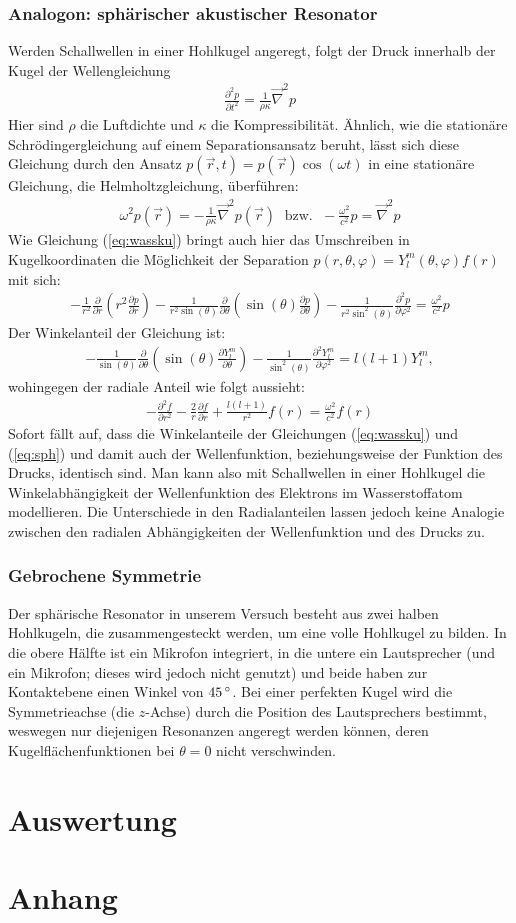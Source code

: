 \documentclass[numbers=noenddot,12pt,a4paper]{scrartcl}
\newcommand{\degree}{^\circ}
\newcommand{\partiell}[2]{\frac{\partial #1}{\partial #2}}
\newcommand{\partiellz}[2]{\frac{\partial^2 #1}{\partial #2^2}}
\begin{document}
\subsubsection{Analogon: sphärischer akustischer Resonator}
Werden Schallwellen in einer Hohlkugel angeregt, folgt der Druck innerhalb der Kugel der Wellengleichung
\begin{align}
\partiellz{p}{t}=\frac{1}{\rho\kappa}\vec{\nabla}^2p
\end{align}
Hier sind $\rho$ die Luftdichte und $\kappa$ die Kompressibilität. Ähnlich, wie die stationäre Schrödingergleichung auf einem Separationsansatz beruht, lässt sich diese Gleichung durch den Ansatz $p(\vec{r},t)=p(\vec{r})\cos(\omega t)$ in eine stationäre Gleichung, die Helmholtzgleichung, überführen:
\begin{align}
\omega^2p(\vec{r})=-\frac{1}{\rho\kappa}\vec{\nabla}^2p(\vec{r})\;\text{ bzw. }\;-\frac{\omega^2}{c^2}p=\vec{\nabla}^2p
\end{align}
Wie Gleichung (\ref{eq:wassku}) bringt auch hier das Umschreiben in Kugelkoordinaten die Möglichkeit der Separation $p(r,\theta,\varphi)=Y_l^m(\theta,\varphi)f(r)$ mit sich:
\begin{align}
-\frac{1}{r^2}\partiell{}{r}\left(r^2\partiell{p}{r}\right)-\frac{1}{r^2\sin(\theta)}\partiell{}{\theta}\left(\sin(\theta)\partiell{p}{\theta}\right)-\frac{1}{r^2\sin^2(\theta)}\partiellz{p}{\varphi}=\frac{\omega^2}{c^2}p\label{eq:sph}
\end{align}
Der Winkelanteil der Gleichung ist:
\begin{align}
-\frac{1}{\sin(\theta)}\partiell{}{\theta}\left(\sin(\theta)\partiell{Y_l^m}{\theta}\right)-\frac{1}{\sin^2(\theta)}\partiellz{Y_l^m}{\varphi}=l(l+1)Y_l^m,
\end{align}
wohingegen der radiale Anteil wie folgt aussieht:
\begin{align}
-\partiellz{f}{r}-\frac{2}{r}\partiell{f}{r}+\frac{l(l+1)}{r^2}f(r)=\frac{\omega^2}{c^2}f(r)
\end{align}
Sofort fällt auf, dass die Winkelanteile der Gleichungen (\ref{eq:wassku}) und (\ref{eq:sph}) und damit auch der Wellenfunktion, beziehungsweise der Funktion des Drucks, identisch sind. Man kann also mit Schallwellen in einer Hohlkugel die Winkelabhängigkeit der Wellenfunktion des Elektrons im Wasserstoffatom modellieren. Die Unterschiede in den Radialanteilen lassen jedoch keine Analogie zwischen den radialen Abhängigkeiten der Wellenfunktion und des Drucks zu.
\subsubsection{Gebrochene Symmetrie}
Der sphärische Resonator in unserem Versuch besteht aus zwei halben Hohlkugeln, die zusammengesteckt werden, um eine volle Hohlkugel zu bilden. In die obere Hälfte ist ein Mikrofon integriert, in die untere ein Lautsprecher (und ein Mikrofon; dieses wird jedoch nicht genutzt) und beide haben zur Kontaktebene einen Winkel von $\unit[45]{\degree}$. Bei einer perfekten Kugel wird die Symmetrieachse (die $z$-Achse) durch die Position des Lautsprechers bestimmt, weswegen nur diejenigen Resonanzen angeregt werden können, deren Kugelflächenfunktionen bei $\theta=0$ nicht verschwinden.
\section{Auswertung}
\section{Anhang}
\end{document}
